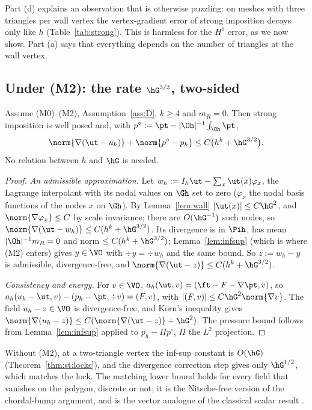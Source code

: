 Part (d) explains an observation that is otherwise puzzling: on meshes with three triangles per wall vertex the vertex-gradient error of strong imposition decays only like $h$ (Table~\ref{tab:strong}). This is harmless for the $H^1$ error, as we now show. Part (a) says that everything depends on the number of triangles at the wall vertex.

\subsection{Under (M2): the rate \texorpdfstring{$\hG^{3/2}$}{h^(3/2)}, two-sided}

\begin{theorem}\label{thm:st:up}
Assume (M0)--(M2), Assumption~\ref{ass:D}, $k\ge4$ and $m_R=0$. Then strong imposition is well posed and, with $p^\circ:=\pt-|\Oh|^{-1}\int_{\Oh}\pt$,
\[
\norm{\nabla(\ut-u_h)}+\norm{p^\circ-p_h}\le C\bigl(h^k+\hG^{3/2}\bigr).
\]
No relation between $h$ and $\hG$ is needed.
\end{theorem}

\begin{proof}
\emph{An admissible approximation.} Let $w_h:=I_h\ut-\sum_x\ut(x)\varphi_x$, the Lagrange interpolant with its nodal values on $\Gh$ set to zero ($\varphi_x$ the nodal basis functions of the nodes $x$ on $\Gh$). By Lemma~\ref{lem:wall} $|\ut(x)|\le C\hG^2$, and $\norm{\nabla\varphi_x}\le C$ by scale invariance; there are $O(\hG^{-1})$ such nodes, so $\norm{\nabla(\ut-w_h)}\le C(h^k+\hG^{3/2})$. Its divergence is in $\Pih$, has mean $|\Oh|^{-1}m_R=0$ and norm $\le C(h^k+\hG^{3/2})$; Lemma~\ref{lem:infsup} (which is where (M2) enters) gives $y\in\VO$ with $\div y=\div w_h$ and the same bound. So $z:=w_h-y$ is admissible, divergence-free, and $\norm{\nabla(\ut-z)}\le C(h^k+\hG^{3/2})$.

\emph{Consistency and energy.} For $v\in\VO$, $a_h(\ut,v)=(\ft-F-\nabla\pt,v)$, so $a_h(u_h-\ut,v)-(p_h-\pt,\div v)=(F,v)$, with $|(F,v)|\le C\hG^2\norm{\nabla v}$. The field $u_h-z\in\VO$ is divergence-free, and Korn's inequality gives $\norm{\nabla(u_h-z)}\le C(\norm{\nabla(\ut-z)}+\hG^2)$. The pressure bound follows from Lemma~\ref{lem:infsup} applied to $p_h-\Pi p^\circ$, $\Pi$ the $L^2$ projection.
\end{proof}

Without (M2), at a two-triangle vertex the inf-sup constant is $O(\hG)$ (Theorem~\ref{thm:st:locks}), and the divergence correction step gives only $\hG^{1/2}$, which matches the lock. The matching lower bound holds for every field that vanishes on the polygon, discrete or not; it is the Nitsche-free version of the chordal-bump argument, and is the vector analogue of the classical scalar result \cite{BergerScottStrang1972,Scott1975}.

